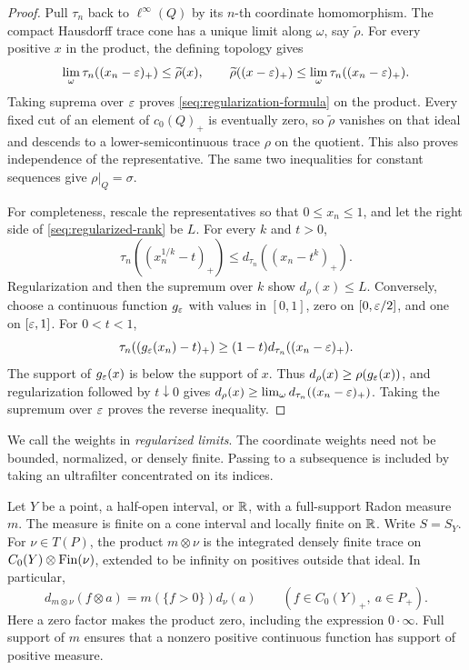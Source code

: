 \begin{proof}
Pull \(\tau_n\) back to \(\ell^\infty(Q)\) by its \(n\)-th
coordinate homomorphism. The compact Hausdorff trace cone has a
unique limit along \(\omega\), say \(\widetilde\rho\).
For every positive \(x\) in the product, the defining topology gives
\[
 \lim_\omega\tau_n((x_n-\varepsilon)_+)
 \leq\widetilde\rho(x),\qquad
 \widetilde\rho((x-\varepsilon)_+)
 \leq\lim_\omega\tau_n((x_n-\varepsilon)_+).
\]
Taking suprema over \(\varepsilon\) proves
\eqref{seq:regularization-formula} on the product.
Every fixed cut of an element of \(c_0(Q)_+\) is eventually zero,
so \(\widetilde\rho\) vanishes on that ideal and descends to a
lower-semicontinuous trace \(\rho\) on the quotient. This also
proves independence of the representative. The same two inequalities
for constant sequences give \(\rho|_Q=\sigma\).

For completeness, rescale the representatives so that
\(0\leq x_n\leq1\), and let the right side of
\eqref{seq:regularized-rank} be \(L\).
For every \(k\) and \(t>0\),
\[
 \tau_n((x_n^{1/k}-t)_+)
 \leq d_{\tau_n}((x_n-t^k)_+).
\]
Regularization and then the supremum over \(k\) show
\(d_\rho(x)\leq L\).
Conversely, choose a continuous function \(g_\varepsilon\) with values in
\([0,1]\), zero on \([0,\varepsilon/2]\), and one on
\([\varepsilon,1]\). For \(0<t<1\),
\[
 \tau_n((g_\varepsilon(x_n)-t)_+)
 \geq(1-t)d_{\tau_n}((x_n-\varepsilon)_+).
\]
The support of \(g_\varepsilon(x)\) is below the support of \(x\).
Thus \(d_\rho(x)\geq\rho(g_\varepsilon(x))\), and regularization followed
by \(t\downarrow0\) gives
\(d_\rho(x)\geq\lim_\omega d_{\tau_n}((x_n-\varepsilon)_+)\).
Taking the supremum over \(\varepsilon\) proves the reverse inequality.
\end{proof}

We call the weights in  \emph{regularized
limits}. The coordinate weights need not be bounded, normalized, or
densely finite. Passing to a subsequence is included by taking an
ultrafilter concentrated on its indices.

Let \(Y\) be a point, a half-open interval, or \(\mathbb R\), with a
full-support Radon measure \(m\). The measure is finite on a cone
interval and locally finite on \(\mathbb R\). Write \(S=S_Y\).
For \(\nu\in T(P)\), the product \(m\otimes\nu\) is the
integrated densely finite trace on
\(C_0(Y)\otimes\operatorname{Fin}(\nu)\), extended to be infinity on positives
outside that ideal. In particular,
\begin{equation}\label{seq:product-rank}
 d_{m\otimes\nu}(f\otimes a)
 =m(\{f>0\})d_\nu(a)
 \qquad(f\in C_0(Y)_+,\ a\in P_+).
\end{equation}
Here a zero factor makes the product zero, including the expression
\(0\cdot\infty\). Full support of \(m\) ensures that a nonzero
positive continuous function has support of positive measure.

